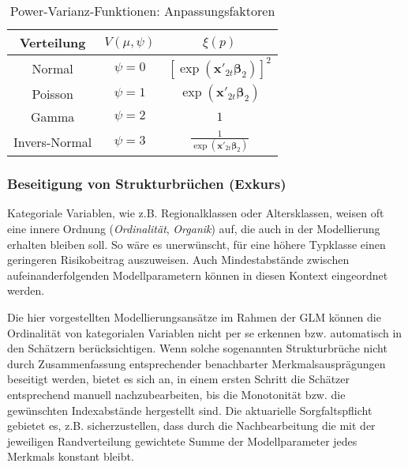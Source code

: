\begin{table}
 \caption{Power-Varianz-Funktionen: Anpassungsfaktoren}

\begin{center}
\begin{tabular}{c|c|c}
    
Verteilung   & $V(\mu, \psi)$  & $\xi(p)$ \\ \hline

Normal               &  $\psi=0$   &   $[\exp(\bm{x'}_{2t} \bm{\beta}_2)]^2$ \\
Poisson              &  $\psi=1$   &   $\exp(\bm{x'}_{2t} \bm{\beta}_2)$ \\
Gamma             &  $\psi=2$   &   $1$ \\
Invers-Normal     &  $\psi=3$   &   $\frac{1}{\exp(\bm{x'}_{2t} \bm{\beta}_2)}$ \\

\end{tabular}
\end{center}

\label{tab:Power_Varianz_Funktionen}
 \end{table}

\subsubsection{Beseitigung von Strukturbrüchen (Exkurs)}

Kategoriale Variablen, wie z.B. Regionalklassen oder Altersklassen, weisen oft eine innere Ordnung (\textit{Ordinalität}, \textit{Organik}) auf, die auch in der Modellierung erhalten bleiben soll. So wäre es unerwünscht, für eine höhere Typklasse einen geringeren Risikobeitrag auszuweisen. Auch Mindestabstände zwischen aufeinanderfolgenden Modellparametern können in diesen Kontext eingeordnet werden.

Die hier vorgestellten Modellierungsansätze im Rahmen der GLM können die Ordinalität von kategorialen Variablen nicht per se erkennen bzw. automatisch in den Schätzern berücksichtigen. Wenn solche sogenannten Strukturbrüche nicht durch Zusammenfassung entsprechender benachbarter Merkmalsausprägungen beseitigt werden, bietet es sich an, in einem ersten Schritt die Schätzer entsprechend manuell nachzubearbeiten, bis die Monotonität bzw. die gewünschten Indexabstände hergestellt sind. Die aktuarielle Sorgfaltspflicht gebietet es, z.B. sicherzustellen, dass durch die Nachbearbeitung die mit der jeweiligen Randverteilung gewichtete Summe der Modellparameter jedes Merkmals konstant bleibt.

